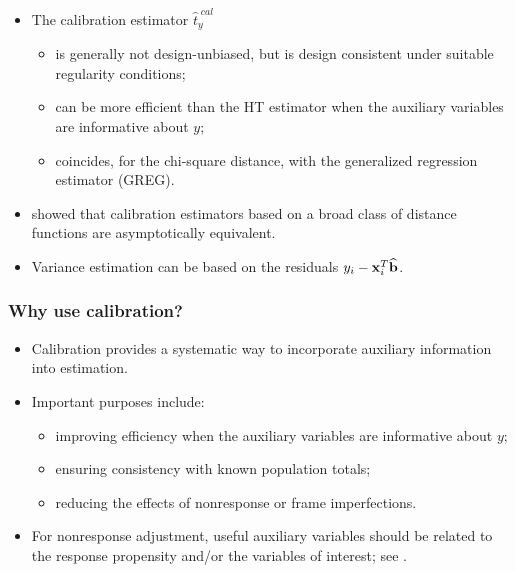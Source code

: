 \documentclass{my_eth_beamer}
\numberwithin{equation}{section}
\begin{document}
\begin{frame}
    \begin{itemize}
    \setlength{\itemsep}{11pt}
        \item The calibration estimator $\widehat t_y^{\;cal}$
            \vspace{0.25em}
            \begin{itemize}
            \setlength{\itemsep}{8pt}
                \item is generally \alert{not design-unbiased}, but is
                    design consistent under suitable regularity conditions;
                \item can be more \alert{efficient} than the HT estimator
                    when the auxiliary variables are informative about $y$;
                \item coincides, for the chi-square distance, with the
                    \alert{generalized regression estimator} (GREG).
            \end{itemize}
        \item \citet{deville_sarndal_1992} showed that calibration estimators
            based on a broad class of \alert{distance functions} are
            asymptotically equivalent.
        \item Variance estimation can be based on the residuals
            $y_i-\bold{x}_i^T\widehat{\bold{b}}$.
    \end{itemize}
\end{frame}

\begin{frame}
    \frametitle{Why use calibration?}
    \begin{itemize}
    \setlength{\itemsep}{11pt}
        \item Calibration provides a systematic way to incorporate
            \alert{auxiliary information} into estimation.
        \item Important purposes include:
            \vspace{0.25em}
            \begin{itemize}
            \setlength{\itemsep}{6pt}
                \item improving \alert{efficiency} when the auxiliary
                    variables are informative about $y$;
                \item ensuring \alert{consistency with known population
                    totals};
                \item reducing the effects of \alert{nonresponse} or frame
                    imperfections.
            \end{itemize}
        \item For nonresponse adjustment, useful auxiliary variables should
            be related to the \alert{response propensity} and/or the
            \alert{variables of interest}; see
            \citet{sarndal_lundstrom_2005}.
    \end{itemize}
\end{frame}
\end{document}
